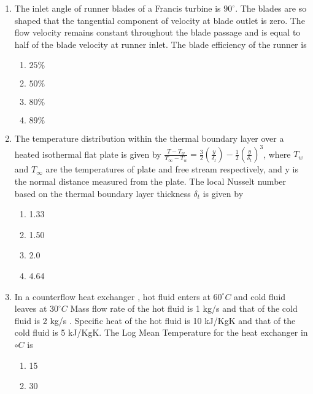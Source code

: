 \documentclass[journal]{IEEEtran}
\begin{document}
\begin{enumerate}
    

    \item The inlet angle of runner blades of a Francis turbine is $90^{\circ}$. The blades are so shaped that the tangential component of velocity at blade outlet is zero. The flow velocity remains constant throughout the blade passage and is equal to half of the blade velocity at runner inlet. The blade efficiency of the runner is
    \begin{multicols}{4}
            \begin{enumerate}
            \item $25 \%$
            \item $50 \%$
            \item $80 \%$
            \item $89 \%$
            \end{enumerate}
        \end{multicols}
    \item  The temperature distribution within the thermal boundary layer over a heated isothermal flat plate is given by
	    $\frac{T-T_w}{T_\infty-T_w}=\frac{3}{2}(\frac{y}{\delta_t})-\frac{1}{2}(\frac{y}{\delta_t})^3$, where $T_w$ and $T_\infty$ are the temperatures of plate and free stream respectively, and y is the normal distance measured from the plate. The local Nusselt number based on the thermal boundary layer thickness $\delta_{t}$ is given by
    \begin{multicols}{4}
            \begin{enumerate}
              \item 1.33
              \item 1.50
              \item 2.0
              \item 4.64
            \end{enumerate}
        \end{multicols}
    \item In a counterflow heat exchanger , hot fluid enters at $60^{\circ} C$ and cold fluid leaves at $30^{\circ} C$ Mass flow rate of the hot fluid is 1 kg/s and that of the cold fluid is 2 kg/s . Specific heat of the hot fluid is 10 kJ/KgK and that of the cold  fluid is 5 kJ/KgK. The Log Mean Temperature for the heat exchanger in ${\circ} C$ is 
    \begin{multicols}{4}
            \begin{enumerate}
              \item 15
              \item 30

\end{enumerate}
\end{multicols}
\end{enumerate}
\end{document}
